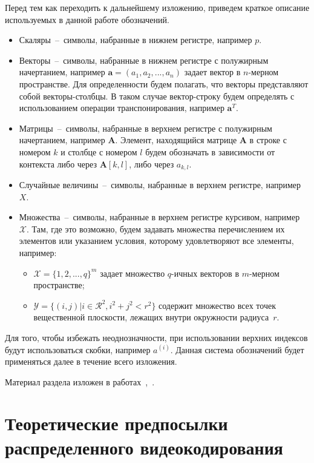 Перед тем как переходить к дальнейшему изложению, приведем краткое описание используемых в данной работе обозначений. 
\begin{itemize}
  \item Скаляры~--~символы, набранные в нижнем регистре, например $p$.
  \item Векторы~--~символы, набранные в нижнем регистре с полужирным начертанием, например $\mathbf{a} = (a_1,a_2,...,a_n)$ задает вектор в $n$-мерном пространстве. Для определенности будем полагать, что векторы представляют собой векторы-столбцы. В таком случае вектор-строку будем определять с использованием операции транспонирования, например $\mathbf{a}^T$.
  \item Матрицы~--~символы, набранные в верхнем регистре с полужирным начертанием, например $\mathbf{A}$. Элемент, находящийся матрице $\mathbf{A}$ в строке с номером $k$ и столбце с номером $l$ будем обозначать в зависимости от контекста либо через $\mathbf{A}[k,l]$, либо через $a_{k,l}$.
  \item Случайные величины~--~символы, набранные в верхнем регистре, например $X$.
  \item Множества~--~символы, набранные в верхнем регистре курсивом, например $\mathcal{X}$. Там, где это возможно, будем задавать множества перечислением их элементов или указанием условия, которому удовлетворяют все элементы, например:
  \begin{itemize}
    \item $\mathcal{X}=\{1,2,...,q\}^m$ задает множество $q$-ичных векторов в $m$-мерном пространстве;
    \item $\mathcal{Y}=\{(i,j) \vert i \in \mathcal{R}^2, i^2+j^2<r^2\}$ содержит множество всех точек вещественной плоскости, лежащих внутри окружности радиуса~$r$.
  \end{itemize}
\end{itemize}

Для того, чтобы избежать неоднозначности, при использовании верхних индексов будут использоваться скобки, например $a^{(i)}$.
Данная система обозначений будет применяться далее в течение всего изложения.

Материал раздела изложен в работах~\cite{VeselovMonograph},~\cite{Priborostroenie2013}.

\section{Теоретические предпосылки распределенного видеокодирования}\label{chap1:HistoricalReview}


